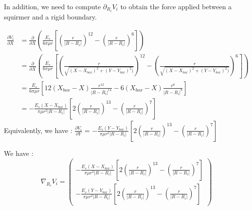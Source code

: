 \documentclass{article}
\begin{document}
\vspace{0,5cm}

In addition, we need to compute $\partial_{R_i} V_i$ to obtain the force applied between a squirmer and a rigid boundary.

\begin{align*}
    \frac{\partial V_i}{\partial X} &= \frac{\partial}{\partial X} \left( \frac{E_s}{6\pi\mu r} \left[ \left( \frac{r}{\lvert R - R_i \rvert} \right)^{12} - \left( \frac{r}{\lvert R - R_i \rvert} \right) ^6 \right] \right) \\
    &= \frac{\partial}{\partial X} \left( \frac{E_s}{6\pi\mu r} \left[ \left( \frac{r}{\sqrt{( X-X_{box})^2 + (Y-Y_{box})^2)}} \right)^{12} - \left( \frac{r}{\sqrt{( X-X_{box})^2 + (Y-Y_{box})^2)}} \right) ^6 \right] \right) \\
    &= \frac{E_s}{6\pi\mu r}\left[ 12(X_{box}-X)\frac{r^{12}}{\lvert R - R_i\rvert^{14}} - 6(X_{box}-X)\frac{r^6}{\lvert R-R_i\rvert^8} \right] \\
    &= -\frac{E_s (X-X_{box})}{\pi\mu r^2 \lvert R - R_i \rvert } \left[ 2 \left( \frac{r}{\lvert R-R_i\rvert} \right)^{13} - \left( \frac{r}{\lvert R-R_i\rvert}\right)^7 \right] 
\end{align*}
Equivalently, we have : $\frac{\partial V_i}{\partial Y}$ = $ - \frac{E_s (Y-Y_{box})}{\pi\mu r^2 \lvert R - R_i \rvert } \left[ 2 \left( \frac{r}{\lvert R-R_i\rvert} \right)^{13} - \left( \frac{r}{\lvert R-R_i\rvert}\right)^7 \right]$

We have : 
\begin{equation*}
    \boxed{\nabla_{R_i} V_i = \begin{pmatrix}
        - \frac{E_s (X-X_{box})}{\pi\mu r^2 \lvert R - R_i \rvert } \left[ 2 \left( \frac{r}{\lvert R-R_i\rvert} \right)^{13} - \left( \frac{r}{\lvert R-R_i\rvert}\right)^7 \right] \\
        - \frac{E_s (Y-Y_{box})}{\pi\mu r^2 \lvert R - R_i \rvert } \left[ 2 \left( \frac{r}{\lvert R-R_i\rvert} \right)^{13} - \left( \frac{r}{\lvert R-R_i\rvert}\right)^7 \right]
    \end{pmatrix}}
\end{equation*}
\end{document}
